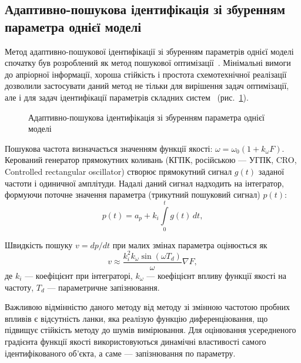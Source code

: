 
\subsection{Адаптивно-пошукова ідентифікація зі збуренням параметра однієї моделі} %

Метод адаптивно-пошукової ідентифікації зі збуренням параметрів
однієї моделі спочатку був розроблений як метод пошукової
оптимізації~\cite{ivah_int_meth_direct,rastr_seu,kras_dyn_nsn,borcov}.
Мінімальні вимоги до апріорної інформації, хороша стійкість і
простота схемотехнічної реалізації дозволили застосувати
даний метод не тільки для вирішення задач оптимізації, але
і для задач ідентифікації параметрів складних систем
\cite{mich_92,mai_adopt_meth_direct,mai_iss_adop_alg_etalon}~(рис.~\ref{atu:f:apid1}).

\begin{figure}[htb!]
\begin{center}

\end{center}
\caption{Адаптивно-пошукова ідентифікація зі збуренням параметра однієї моделі}
\label{atu:f:apid1}
\end{figure}

Пошукова частота визначається значенням функції якості:
\( \omega = \omega_0 ( 1 + k_\omega F ) \).
Керований генератор прямокутних коливань
(КГПК, російською --- УГПК, CRO, Controlled rectangular oscillator)
створює прямокутний сигнал $g(t)$ заданої частоти і одиничної
амплітуди. Надалі даний сигнал надходить на інтегратор, формуючи
поточне значення параметра (трикутний пошуковий сигнал) $p(t)$:
%
\begin{equation}
 p(t) = a_p + k_i \int\limits_{0}^{t} g(t) \, dt ,
\label{atu:eq:api_integr}
\end{equation}

Швидкість пошуку
$ v = dp / dt $ при малих змінах параметра оцінюється як
%
\begin{equation}
\label{atu:eq:vasi}
  v
  \approx
  \frac{k_i^2 k_\omega \sin(\omega T_d) }{\omega} \nabla {F},
\end{equation}
%
де
$ k_i $ --- коефіцієнт при інтеграторі,
$ k_\omega $ --- коефіцієнт впливу функції якості на частоту,
$ T_d $ --- параметричне запізнювання.

Важливою відмінністю даного методу від методу зі змінною
частотою пробних впливів є відсутність
ланки, яка реалізую функцію
диференціювання,
що підвищує стійкість методу до шумів вимірювання. Для
оцінювання усередненого градієнта функції якості
використовуються динамічні властивості самого
ідентифікованого об'єкта, а саме --- запізнювання по параметру.

